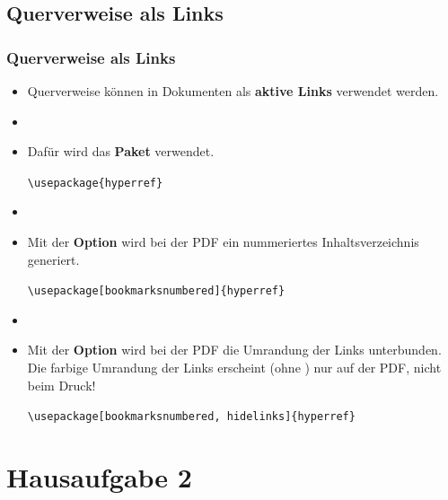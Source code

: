 \subsection{Querverweise als Links}

\begin{frame}[fragile]
\frametitle{Querverweise als Links}

\begin{itemize}
	\item Querverweise können in Dokumenten als \textbf{aktive Links} verwendet werden. 
	\item[]
	\item Dafür wird das \textbf{Paket } verwendet.
	
	\lstinline|\usepackage{hyperref}|
	
	\item[]	
	\item Mit der \textbf{Option } wird bei der PDF ein nummeriertes Inhaltsverzeichnis generiert.
	
	\lstinline|\usepackage[bookmarksnumbered]{hyperref}|

	\item[]	
	\item Mit der \textbf{Option } wird bei der PDF die Umrandung der Links unterbunden. Die farbige Umrandung der Links erscheint (ohne ) nur auf der PDF, nicht beim Druck! 
	
	\lstinline|\usepackage[bookmarksnumbered, hidelinks]{hyperref}|
\end{itemize}

\end{frame}


\section{Hausaufgabe 2}

